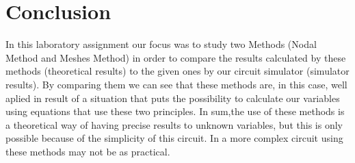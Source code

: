 \section{Conclusion}
\label{sec:conclusion}

In this laboratory assignment our focus was to study two Methods (Nodal Method and Meshes Method) in order to compare the results calculated by these methods (theoretical results) to the given ones by our circuit simulator (simulator results). By comparing them we can see that these methods are, in this case, well aplied in result of a situation that puts the possibility to calculate our variables using equations that use these two principles.
In sum,the use of these methods is a theoretical way of having precise results to unknown variables, but this is only possible because of the simplicity of this circuit. In a more complex circuit using these methods may not be as practical.

